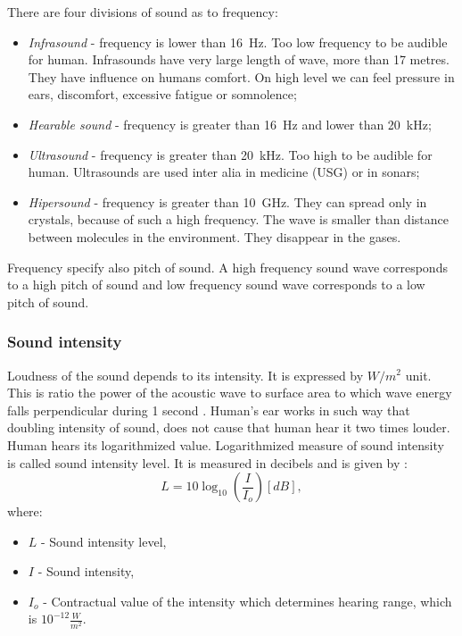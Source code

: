 \documentclass[11pt,titlepage]{article}
\theoremstyle{plain}
\begin{document}
There are four divisions of sound as to frequency:
\begin{itemize}
	\item \textit{Infrasound} - frequency is lower than 16~Hz. Too low frequency to be audible for human. Infrasounds have very large length of wave, more than 17 metres. They have influence on humans comfort. On high level we can feel pressure in ears, discomfort, excessive fatigue or somnolence;
	\item \textit{Hearable sound} - frequency is greater than 16~Hz and lower than 20~kHz;
	\item \textit{Ultrasound} - frequency is greater than 20~kHz. Too high to be audible for human. Ultrasounds are used inter alia in medicine (USG) or in sonars;
	\item \textit{Hipersound} - frequency is greater than 10~GHz. They can spread only in crystals, because of such a high frequency. The wave is smaller than distance between molecules in the environment. They disappear in the gases.
\end{itemize}

Frequency specify also pitch of sound. A high frequency sound wave corresponds to a high pitch of sound and low frequency sound wave corresponds to a low pitch of sound.

\subsubsection{Sound intensity}
Loudness of the sound depends to its intensity. It is expressed by $W/m^2$ unit. This is ratio the power of the acoustic wave to surface area to which wave energy falls perpendicular during 1 second \cite{sound_intensity}. Human's ear works in such way that doubling intensity of sound, does not cause that human hear it two times louder. Human hears its logarithmized value. Logarithmized measure of sound intensity is called sound intensity level. It is measured in decibels and is given by \cite{decibels}:
\begin{equation}
	L = 10\log_{10}\left(\frac{I}{I_o}\right)  [dB],
\end{equation}
where:
\begin{itemize}
	\item $L$ - Sound intensity level,
	\item $I$ - Sound intensity,
	\item $I_o$ - Contractual value of the intensity which determines hearing range, which is $10^{-12}\frac{W}{m^2}.$
\end{itemize}
\end{document}
